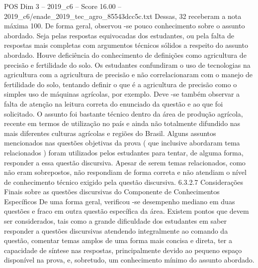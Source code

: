 \begin{textsample}{POS Dim 3 – 2019\_c6 – Score 16.00 – 2019\_c6/enade\_2019\_tec\_agro\_85543dcc5c.txt}
Dessas, 32 receberam a nota máxima 100.
De forma geral, observou -se pouco conhecimento sobre o assunto abordado.
Seja pelas respostas equivocadas dos estudantes, ou pela falta de respostas mais completas com argumentos técnicos sólidos a respeito do assunto abordado.
Houve deficiência do conhecimento de definições como agricultura de precisão e fertilidade do solo.
Os estudantes confundiram o uso de tecnologias na agricultura com a agricultura de precisão e não correlacionaram com o manejo de fertilidade do solo, tentando definir o que é a agricultura de precisão como o simples uso de máquinas agrícolas, por exemplo.
Deve -se também observar a falta de atenção na leitura correta do enunciado da questão e ao que foi solicitado.
O assunto foi bastante técnico dentro da área de produção agrícola, recente em termos de utilização no país e ainda não totalmente difundido nas mais diferentes culturas agrícolas e regiões do Brasil.
Alguns assuntos mencionados nas questões objetivas da prova ( que inclusive abordaram tema relacionados ) foram utilizados pelos estudantes para tentar, de alguma forma, responder a essa questão discursiva.
Apesar de serem temas relacionados, como não eram sobrepostos, não respondiam de forma correta e não atendiam o nível de conhecimento técnico exigido pela questão discursiva. 6.3.2.7 Considerações Finais sobre as questões discursivas do Componente de Conhecimentos Específicos De uma forma geral, verificou -se desempenho mediano em duas questões e fraco em outra questão específica da área.
Existem pontos que devem ser considerados, tais como a grande dificuldade dos estudantes em saber responder a questões discursivas atendendo integralmente ao comando da questão, comentar temas amplos de uma forma mais concisa e direta, ter a capacidade de síntese nas respostas, principalmente devido ao pequeno espaço disponível na prova, e, sobretudo, um conhecimento mínimo do assunto abordado.

\end{textsample}
